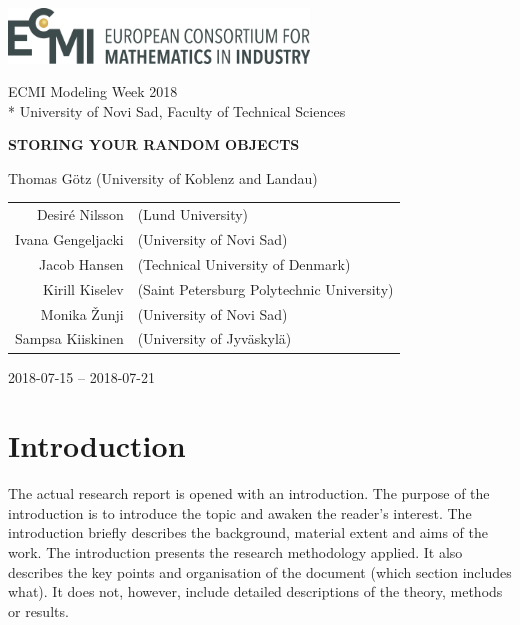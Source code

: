 \documentclass[12pt, sumlimits, intlimits]{article}
\begin{document}
\includegraphics[width=8cm]{ecmi-logo.png}

ECMI Modeling Week 2018 \\*
University of Novi Sad, Faculty of Technical Sciences

\begin{center}
\vspace{2.0cm}
{\Large{\textbf{\MakeUppercase{Storing your random objects}}}}


Thomas Götz (University of Koblenz and Landau)


\begin{tabular}{rl}
Desiré Nilsson & (Lund University) \\
Ivana Gengeljacki & (University of Novi Sad) \\
Jacob Hansen & (Technical University of Denmark) \\
Kirill Kiselev & (Saint Petersburg Polytechnic University) \\
Monika Žunji & (University of Novi Sad) \\
Sampsa Kiiskinen & (University of Jyväskylä)
\end{tabular}


2018-07-15 -- 2018-07-21

\end{center}


\clearpage

\tableofcontents

\clearpage

\section{Introduction}

The actual research report is opened with an introduction. The purpose of the
introduction is to introduce the topic and awaken the reader's interest. The
introduction briefly describes the background, material extent and aims of the
work. The introduction presents the research methodology applied. It also
describes the key points and organisation of the document (which section
includes what). It does not, however, include detailed descriptions of the
theory, methods or results.
\end{document}
